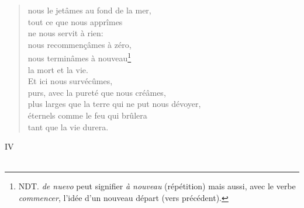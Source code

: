\documentclass[11pt,a4paper]{book}
\begin{document}
\begin{verse}
nous le jetâmes au fond de la mer, \\
tout ce que nous apprîmes \\
ne nous servit à rien: \\
nous recommen\c{c}âmes à zéro, \\
nous terminâmes à nouveau\footnote{NDT. {\em de nuevo} peut signifier
{\em à nouveau} (répétition) mais aussi, avec le verbe {\em commencer},
l'idée d'un nouveau départ (vers précédent).} \\
la mort et la vie. \\
Et ici nous survécûmes, \\
purs, avec la pureté que nous créâmes, \\
plus larges que la terre qui ne put nous dévoyer, \\
éternels comme le feu qui brûlera \\
tant que la vie durera.
\end{verse}

\newpage

{\huge IV} \\ \\
\end{document}
